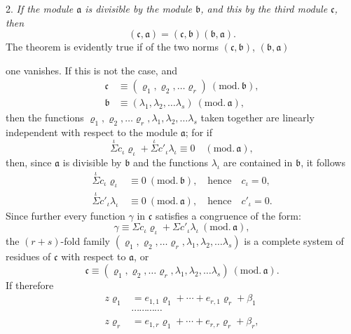 \documentclass{article}
\begin{document}
2. \emph{If the module $\mathfrak{a}$ is divisible by the module $\mathfrak{b}$, and this by the third module $\mathfrak{c}$, then}
\[ (\mathfrak{c}, \mathfrak{a}) = (\mathfrak{c}, \mathfrak{b})(\mathfrak{b}, \mathfrak{a}). \]
The theorem is evidently true if of the two norms $(\mathfrak{c}, \mathfrak{b})$, $(\mathfrak{b}, \mathfrak{a})$

one vanishes. If this is not the case, and
\[ \begin{aligned} \mathfrak{c} &\equiv (\varrho_{1}, \varrho_{2}, \ldots \varrho_{r}) \ (\text{mod.}\,\mathfrak{b}), \\ \mathfrak{b} &\equiv (\lambda_{1}, \lambda_{2}, \ldots \lambda_{s}) \ (\text{mod.}\,\mathfrak{a}), \end{aligned} \]
then the functions $\varrho_{1}, \varrho_{2}, \ldots \varrho_{r}, \lambda_{1}, \lambda_{2}, \ldots \lambda_{s}$ taken together are linearly independent with respect to the module $\mathfrak{a}$; for if
\[ \overset{\iota}{\Sigma} c_{\iota}\varrho_{\iota} + \overset{\iota}{\Sigma} c'_{\iota}\lambda_{\iota} \equiv 0 \quad (\text{mod.}\,\mathfrak{a}), \]
then, since $\mathfrak{a}$ is divisible by $\mathfrak{b}$ and the functions $\lambda_{\iota}$ are contained in $\mathfrak{b}$, it follows
\[ \begin{aligned} \overset{\iota}{\Sigma} c_{\iota}\varrho_{\iota} &\equiv 0 \ (\text{mod.}\,\mathfrak{b}), \quad \text{hence} \quad c_{\iota} = 0, \\ \overset{\iota}{\Sigma} c'_{\iota}\lambda_{\iota} &\equiv 0 \ (\text{mod.}\,\mathfrak{a}), \quad \text{hence} \quad c'_{\iota} = 0. \end{aligned} \]
Since further every function $\gamma$ in $\mathfrak{c}$ satisfies a congruence of the form:
\[ \gamma \equiv \Sigma c_{\iota}\varrho_{\iota} + \Sigma c'_{\iota}\lambda_{\iota} \ (\text{mod.}\,\mathfrak{a}), \]
the $(r+s)$-fold family $(\varrho_{1}, \varrho_{2}, \ldots \varrho_{r}, \lambda_{1}, \lambda_{2}, \ldots \lambda_{s})$ is a complete system of residues of $\mathfrak{c}$ with respect to $\mathfrak{a}$, or
\[ \mathfrak{c} \equiv (\varrho_{1}, \varrho_{2}, \ldots \varrho_{r}, \lambda_{1}, \lambda_{2}, \ldots \lambda_{s}) \ (\text{mod.}\,\mathfrak{a}). \]
If therefore
\[ \begin{aligned} z\varrho_{1} &= e_{1,1}\varrho_{1} + \cdots + e_{r,1}\varrho_{r} + \beta_{1} \\ &\cdots\cdots\cdots\cdots \\ z\varrho_{r} &= e_{1,r}\varrho_{1} + \cdots + e_{r,r}\varrho_{r} + \beta_{r}, \end{aligned} \]
\end{document}
